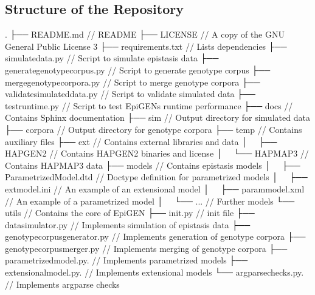 \documentclass[a4paper,10pt,english]{sphinxhowto}
\begin{document}
\subsection{Structure of the Repository}
\label{\detokenize{README:structure-of-the-repository}}
\begin{sphinxVerbatim}[commandchars=\\\{\}]
.
├── README.md                        // README
├── LICENSE                          // A copy of the GNU General Public License 3
├── requirements.txt                 // Lists dependencies
├── simulate\PYGZus{}data.py                 // Script to simulate epistasis data
├── generate\PYGZus{}genotype\PYGZus{}corpus.py      // Script to generate genotype corpus
├── merge\PYGZus{}genotype\PYGZus{}corpora.py        // Script to merge genotype corpora
├── validate\PYGZus{}simulated\PYGZus{}data.py       // Script to validate simulated data
├── test\PYGZus{}runtime.py                  // Script to test EpiGEN\PYGZsq{}s runtime performance
├── docs                             // Contains Sphinx documentation
├── sim                              // Output directory for simulated data
├── corpora                          // Output directory for genotype corpora
├── temp                             // Contains auxiliary files 
├── ext                              // Contains external libraries and data
│   ├── HAPGEN2                      // Contains HAPGEN2 binaries and license
│   └── HAPMAP3                      // Contains HAPMAP3 data
├── models                           // Contains epistasis models
│   ├── ParametrizedModel.dtd        // Doctype definition for parametrized models
│   ├── ext\PYGZus{}model.ini                // An example of an extensional model
│   ├── param\PYGZus{}model.xml              // An example of a parametrized model
│   └── ...                          // Further models
└── utils                            // Contains the core of EpiGEN
    ├── \PYGZus{}\PYGZus{}init\PYGZus{}\PYGZus{}.py                  // \PYGZus{}\PYGZus{}init\PYGZus{}\PYGZus{} file
    ├── data\PYGZus{}simulator.py            // Implements simulation of epistasis data
    ├── genotype\PYGZus{}corpus\PYGZus{}generator.py // Implements generation of genotype corpora
    ├── genotype\PYGZus{}corpusmerger.py     // Implements merging of genotype corpora
    ├── parametrized\PYGZus{}model.py.       // Implements parametrized models 
    ├── extensional\PYGZus{}model.py.        // Implements extensional models
    └── argparse\PYGZus{}checks.py.          // Implements argparse checks
\end{sphinxVerbatim}
\end{document}
